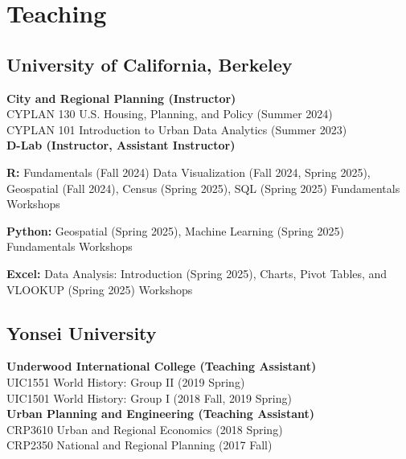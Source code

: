 \documentclass[12pt,letterpaper]{report}
\newcommand{\listitemspace}{0.4em}
\renewenvironment{itemize}
{\begin{list}{}{\setlength{\leftmargin}{0.5em}
                \setlength{\parskip}{0em}
                \setlength{\itemsep}{\listitemspace}
                \setlength{\parsep}{\listitemspace}}}
{\end{list}}
\begin{document}
 \section*{Teaching}
    \subsection*{University of California, Berkeley}
    \textbf{City and Regional Planning  (Instructor)}\\
      CYPLAN 130 U.S. Housing, Planning, and Policy (Summer 2024)\\
      CYPLAN 101 Introduction to Urban Data Analytics (Summer 2023)\\[0.6em]
    \textbf{D-Lab (Instructor, Assistant Instructor)} 
    \vspace{-0.4em}
      \begin{itemize}
      \addtolength{\leftskip}{0em} 
      \setlength{\itemsep}{-0.2em}
      \item[•] \textbf{R:} Fundamentals (Fall 2024) Data Visualization (Fall 2024, Spring 2025), Geospatial (Fall 2024), Census  (Spring 2025), SQL (Spring 2025) Fundamentals Workshops
      \item[•] \textbf{Python:} Geospatial (Spring 2025), Machine Learning (Spring 2025) Fundamentals Workshops
      \item[•] \textbf{Excel:} Data Analysis: Introduction (Spring 2025), Charts, Pivot Tables, and VLOOKUP (Spring 2025) Workshops
    \end{itemize}

   \subsection*{Yonsei University}
   \textbf{Underwood International College (Teaching Assistant)}\\ 
    UIC1551 World History: Group II (2019 Spring)\\
    UIC1501 World History: Group I  (2018 Fall, 2019 Spring)\\[0.6em]
  \textbf{Urban Planning and Engineering (Teaching Assistant)}\\ 
    CRP3610 Urban and Regional Economics (2018 Spring)\\
    CRP2350 National and Regional Planning (2017 Fall)
\end{document}
